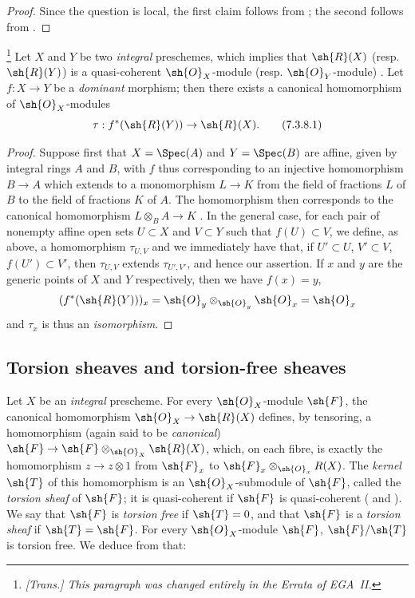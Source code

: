 \begin{proof}
Since the question is local, the first claim follows from ; the second follows from .
\end{proof}

\begin{env}[7.3.8]
\label{I.7.3.8}
\footnote{\emph{[Trans.] This paragraph was changed entirely in the Errata of EGA~II.}}
Let $X$ and $Y$ be two \emph{integral} preschemes, which implies that $\sh{R}(X)$ (resp. $\sh{R}(Y)$) is a quasi-coherent $\sh{O}_X$-module (resp. $\sh{O}_Y$-module) .
Let $f:X\to Y$ be a \emph{dominant} morphism; then there exists a canonical homomorphism of $\sh{O}_X$-modules
\[
\label{I.7.3.8.1}
  \tau:f^*(\sh{R}(Y))\to\sh{R}(X).
  \tag{7.3.8.1}
\]
\end{env}

\begin{proof}
Suppose first that $X=\Spec(A)$ and $Y=\Spec(B)$ are affine, given by integral rings $A$ and $B$, with $f$ thus corresponding to an injective homomorphism $B\to A$ which extends to a monomorphism $L\to K$ from the field of fractions $L$ of $B$ to the field of fractions $K$ of $A$.
The homomorphism  then corresponds to the canonical homomorphism $L\otimes_B A\to K$ .
In the general case, for each pair of nonempty affine open sets $U\subset X$ and $V\subset Y$ such that $f(U)\subset V$, we define, as above, a homomorphism $\tau_{U,V}$ and we immediately have that, if $U'\subset U$, $V'\subset V$, $f(U')\subset V'$, then $\tau_{U,V}$ extends $\tau_{U',V'}$, and hence our assertion.
If $x$ and $y$ are the generic points of $X$ and $Y$ respectively, then we have $f(x)=y$,
\[
  (f^*(\sh{R}(Y)))_x=\sh{O}_y\otimes_{\sh{O}_y}\sh{O}_x=\sh{O}_x
\]
 and $\tau_x$ is thus an \emph{isomorphism}.
\end{proof}

\subsection{Torsion sheaves and torsion-free sheaves}
\label{subsection:I.7.4}

\begin{env}[7.4.1]
\label{I.7.4.1}
Let $X$ be an \emph{integral} prescheme.
For every $\sh{O}_X$-module $\sh{F}$, the canonical homomorphism $\sh{O}_X\to\sh{R}(X)$ defines, by tensoring, a homomorphism (again said to be \emph{canonical}) $\sh{F}\to\sh{F}\otimes_{\sh{O}_X}\sh{R}(X)$, which, on each fibre, is exactly the homomorphism $z\to z\otimes1$ from $\sh{F}_x$ to $\sh{F}_x\otimes_{\sh{O}_x}R(X)$.
The \emph{kernel $\sh{T}$} of this homomorphism is an $\sh{O}_X$-submodule of $\sh{F}$, called the \emph{torsion sheaf} of $\sh{F}$; it is quasi-coherent if $\sh{F}$ is quasi-coherent ( and ).
We say that $\sh{F}$ is \emph{torsion free} if $\sh{T}=0$, and that $\sh{F}$ is a \emph{torsion sheaf} if $\sh{T}=\sh{F}$.
For every $\sh{O}_X$-module $\sh{F}$, $\sh{F}/\sh{T}$ is torsion free.
We deduce from  that:
\end{env}

